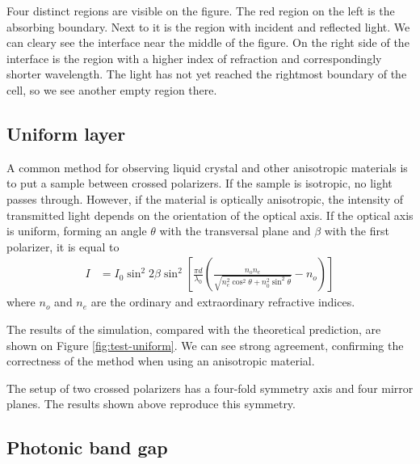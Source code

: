 \documentclass[a4paper,10pt]{article}
\renewenvironment{figure}
  {\par\medskip\noindent\minipage{\linewidth}}
  {\endminipage\par\medskip}
\begin{document}
\begin{multicols}{2}
Four distinct regions are visible on the figure. 
The red region on the left is the absorbing boundary. 
Next to it is the region with incident and reflected light. 
We can cleary see the interface near the middle of the figure. 
On the right side of the interface is the region with a higher index of refraction and correspondingly shorter wavelength. 
The light has not yet reached the rightmost boundary of the cell, so we see another empty region there. 

\subsection{Uniform layer}

A common method for observing liquid crystal and other anisotropic materials is to put a sample between crossed polarizers. 
If the sample is isotropic, no light passes through. 
However, if the material is optically anisotropic, the intensity of transmitted light depends on the orientation of the optical axis. 
If the optical axis is uniform, forming an angle $\theta$ with the transversal plane and $\beta$ with the first polarizer, it is equal to\cite{kleman}
\begin{align}
 I &= I_0 \sin^2 2\beta \sin^2 \left[ \frac{\pi d}{\lambda_0} \left( \frac{n_o n_e}{\sqrt{n_e^2 \cos^2 \theta + n_0^2 \sin^2 \theta}} - n_o \right)\right] \nonumber
\end{align}
where $n_o$ and $n_e$ are the ordinary and extraordinary refractive indices. 

The results of the simulation, compared with the theoretical prediction, are shown on Figure \ref{fig:test-uniform}. 
We can see strong agreement, confirming the correctness of the method when using an anisotropic material. 

\begin{figure}
\centering
 \resizebox{\textwidth}{!}{}
 \label{fig:test-uniform}
\end{figure}

The setup of two crossed polarizers has a four-fold symmetry axis and four mirror planes. 
The results shown above reproduce this symmetry. 

\subsection{Photonic band gap}


\end{multicols}
\end{document}
